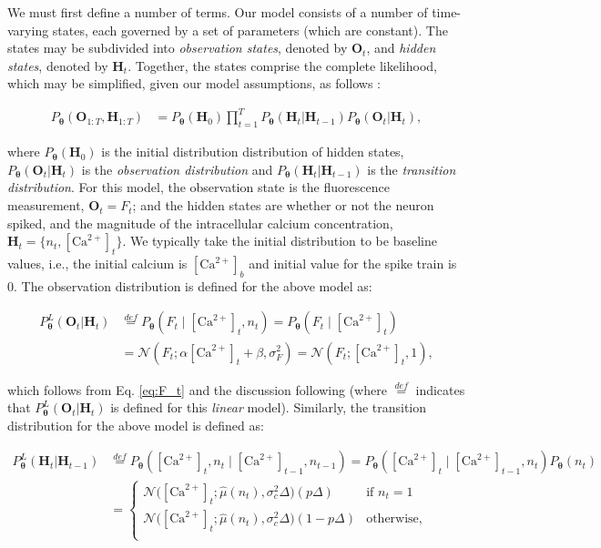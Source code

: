 \documentclass[10pt]{article}
\providecommand{\ve}[1]{\boldsymbol{#1}}
\providecommand{\ve}[1]{\boldsymbol{#1}}
\newcommand{\thetn}{\ve{\theta}}
\newcommand{\p}{P_{\thetn}}
\newcommand{\Ca}{[\text{Ca}^{2+}]}
\begin{document}
We must first define a number of terms. Our model consists of a number of time-varying states, each governed by a set of parameters (which are constant). The states may be subdivided into \emph{observation states}, denoted by $\ve{O}_t$, and \emph{hidden states}, denoted by $\ve{H}_t$. Together, the states comprise the complete likelihood, which may be simplified, given our model assumptions, as follows \cite{Rabiner89}:

\begin{align} \label{eq:complete}
\p (\ve{O}_{1:T}, \ve{H}_{1:T}) &= \p(\ve{H}_0) \prod_{t=1}^T \p(\ve{H}_t | \ve{H}_{t-1}) \p(\ve{O}_t | \ve{H}_t),
\end{align}

\noindent where $\p(\ve{H}_0)$ is the initial distribution distribution of hidden states, $\p(\ve{O}_t | \ve{H}_t)$ is the \emph{observation distribution} and $\p(\ve{H}_t | \ve{H}_{t-1})$ is the \emph{transition distribution}. For this model, the observation state is the fluorescence measurement, $\ve{O}_t=F_t$; and the hidden states are whether or not the neuron spiked, and the magnitude of the intracellular calcium concentration, $\ve{H}_t=\{n_t,\Ca_t\}$.  We typically take the initial distribution to be baseline values, i.e., the initial calcium is $\Ca_b$ and initial value for the spike train is $0$. The observation distribution is defined for the above model as: %

\begin{align} \label{eq:obs_dist}
\p^L(\ve{O}_t | \ve{H}_t)  &\overset{def}{=}  \p(F_t \mid  \Ca_t,n_t) =  \p(F_t \mid  \Ca_t) \nonumber \\
&= \mathcal{N}(F_t; \alpha \Ca_t + \beta ,\sigma_F^2) = \mathcal{N}(F_t; \Ca_t, 1),
\end{align} 

\noindent which follows from Eq. \ref{eq:F_t} and the discussion following (where $\overset{def}{=}$ indicates that $\p^L(\ve{O}_t | \ve{H}_t)$ is defined for this \emph{linear} model). Similarly, the transition distribution for the above model is defined as: %

\begin{align} \label{eq:trans_dist}
\p^L(\ve{H}_t | \ve{H}_{t-1}) &\overset{def}{=} \p(\Ca_t,n_t \mid \Ca_{t-1},n_{t-1}) %
= \p(\Ca_t \mid \Ca_{t-1}, n_t) \p(n_t) \nonumber \\
&= 
\begin{cases}
\mathcal{N}\big(\Ca_t; \widehat{\mu}(n_t), \sigma_c^2 \Delta\big) (p \Delta)& \text{if } n_t=1 \\
\mathcal{N}\big(\Ca_t; \widehat{\mu}(n_t), \sigma_c^2 \Delta\big) (1-p \Delta)& \text{otherwise,}\\
\end{cases}
\end{align}
\end{document}
